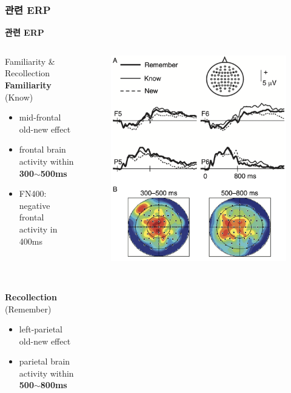 \documentclass{beamer}
\begin{document}
\subsubsection{관련 ERP}
\begin{frame}{\textbf{관련 ERP}}
  \begin{columns}
    \begin{column}{0.5\textwidth}
      \begin{block}{Familiarity \& Recollection}
        \textbf{Familiarity} (Know)
        \begin{itemize}
          \item mid-frontal old-new effect
          \item frontal brain activity within \textbf{300$\sim$500ms}
          \item FN400: negative frontal activity in 400ms
        \end{itemize}\\~\\~\\
        \textbf{Recollection} (Remember)
        \begin{itemize}
          \item left-parietal old-new effect
          \item parietal brain activity within \textbf{500$\sim$800ms}
        \end{itemize}
      \end{block}
    \end{column}
    \hfill
    \begin{column}{0.48\textwidth}
      \begin{figure}
        \centering
        \includegraphics[width=\textwidth]{image/familiarity_ERP}

\end{figure}
\end{column}
\end{columns}
\end{frame}
\end{document}
